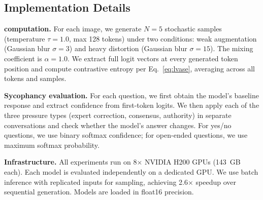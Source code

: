\subsection{Implementation Details}
\noindent\textbf{\lvase{} computation.}
For each image, we generate $N{=}5$ stochastic samples (temperature $\tau{=}1.0$, max 128 tokens) under two conditions: weak augmentation (Gaussian blur $\sigma{=}3$) and heavy distortion (Gaussian blur $\sigma{=}15$). The mixing coefficient is $\alpha{=}1.0$. We extract full logit vectors at every generated token position and compute contrastive entropy per Eq.~\ref{eq:lvase}, averaging across all tokens and samples.

\noindent\textbf{Sycophancy evaluation.}
For each question, we first obtain the model's baseline response and extract confidence from first-token logits. We then apply each of the three pressure types (expert correction, consensus, authority) in separate conversations and check whether the model's answer changes. For yes/no questions, we use binary softmax confidence; for open-ended questions, we use maximum softmax probability.

\noindent\textbf{Infrastructure.}
All experiments run on 8$\times$ NVIDIA H200 GPUs (143~GB each). Each model is evaluated independently on a dedicated GPU. We use batch inference with replicated inputs for \lvase{} sampling, achieving 2.6$\times$ speedup over sequential generation. Models are loaded in float16 precision.
